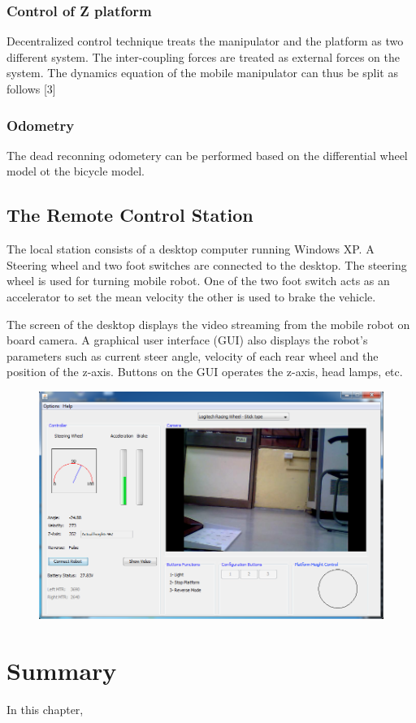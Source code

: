 \subsubsection{Control of Z platform}
Decentralized control technique treats the manipulator and the platform as two different system. The inter-coupling forces are treated as external forces on the system. The dynamics equation of the mobile manipulator can thus be split as follows [3]
\subsubsection{Odometry }
The dead reconning odometery can be performed based on the differential wheel model ot the bicycle model.
\subsection{The Remote Control Station}   
The local station consists of a desktop computer running Windows XP. A Steering wheel and two foot switches are connected to the desktop. The steering wheel is used for turning  mobile robot. One of the two foot switch acts as an accelerator to set the mean velocity the other  is used to brake the vehicle.

The screen of the desktop displays the video streaming  from the mobile robot on board camera. A graphical user  interface (GUI) also displays the robot's parameters such as current steer angle, velocity of each rear wheel and the position of the z-axis. Buttons on the GUI operates the z-axis, head lamps, etc.

\begin{figure}
	\includegraphics[width=\linewidth,keepaspectratio]{Chapter5/fig/gui}
	\label{fig:Gui} 
\end{figure}



\section{Summary}
In this chapter, 